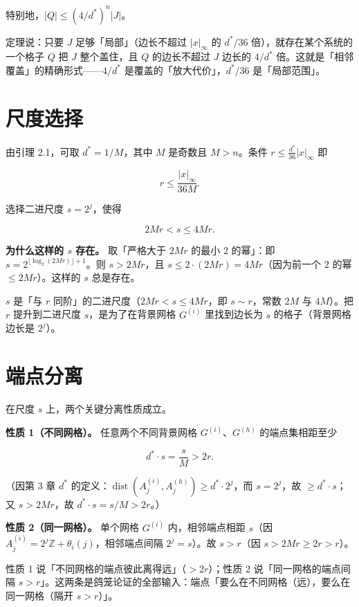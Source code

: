 \documentclass[a4paper,11pt,openany]{ctexbook}
\numberwithin{equation}{chapter}
\numberwithin{figure}{chapter}
\numberwithin{table}{chapter}
\begin{document}
特别地，$|Q|\le(4/d^*)^n|J|$。

\begin{intuitionbox}
定理说：只要 $J$ 足够「局部」（边长不超过 $|x|_\infty$ 的 $d^*/36$ 倍），就存在某个系统的一个格子 $Q$ 把 $J$ 整个盖住，且 $Q$ 的边长不超过 $J$ 边长的 $4/d^*$ 倍。这就是「相邻覆盖」的精确形式——$4/d^*$ 是覆盖的「放大代价」，$d^*/36$ 是「局部范围」。
\end{intuitionbox}

\section{尺度选择}

由引理 2.1，可取 $d^*=1/M$，其中 $M$ 是奇数且 $M>n$。条件 $r\le\frac{d^*}{36}|x|_\infty$ 即

$$r\le\frac{|x|_\infty}{36M}.$$

选择二进尺度 $s=2^j$，使得

$$2Mr<s\le4Mr.$$

\textbf{为什么这样的 $s$ 存在。} 取「严格大于 $2Mr$ 的最小 $2$ 的幂」：即 $s=2^{\lfloor\log_2(2Mr)\rfloor+1}$。则 $s>2Mr$，且 $s\le2\cdot(2Mr)=4Mr$（因为前一个 $2$ 的幂 $\le2Mr$）。这样的 $s$ 总是存在。

\begin{intuitionbox}
$s$ 是「与 $r$ 同阶」的二进尺度（$2Mr<s\le4Mr$，即 $s\sim r$，常数 $2M$ 与 $4M$）。把 $r$ 提升到二进尺度 $s$，是为了在背景网格 $G^{(i)}$ 里找到边长为 $s$ 的格子（背景网格边长是 $2^j$）。
\end{intuitionbox}

\section{端点分离}

在尺度 $s$ 上，两个关键分离性质成立。

\textbf{性质 1（不同网格）。} 任意两个不同背景网格 $G^{(i)}$、$G^{(h)}$ 的端点集相距至少

$$d^*\cdot s=\frac{s}{M}>2r.$$

（因第 3 章 $d^*$ 的定义：$\operatorname{dist}(A_j^{(i)},A_j^{(h)})\ge d^*\cdot2^j$，而 $s=2^j$，故 $\ge d^*\cdot s$；又 $s>2Mr$，故 $d^*\cdot s=s/M>2r$。）

\textbf{性质 2（同一网格）。} 单个网格 $G^{(i)}$ 内，相邻端点相距 $s$（因 $A_j^{(i)}=2^j\mathbb Z+\theta_i(j)$，相邻端点间隔 $2^j=s$）。故 $s>r$（因 $s>2Mr\ge2r>r$）。

\begin{intuitionbox}
性质 1 说「不同网格的端点彼此离得远」（$>2r$）；性质 2 说「同一网格的端点间隔 $s>r$」。这两条是鸽笼论证的全部输入：端点「要么在不同网格（远），要么在同一网格（隔开 $s>r$）」。
\end{intuitionbox}
\end{document}

